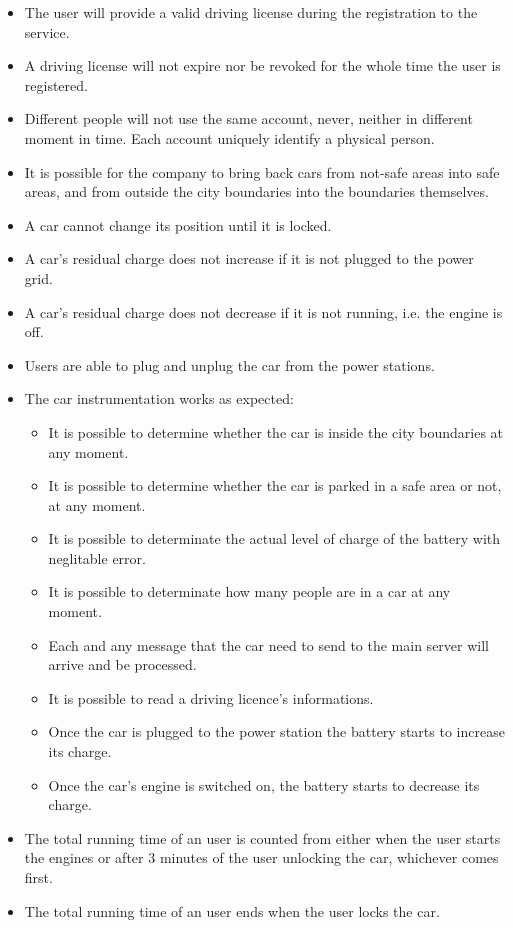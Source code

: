 \documentclass[11pt]{article} %
\begin{document}
\begin{itemize}
	\item The user will provide a valid driving license during the registration to the service.
	\item A driving license will not expire nor be revoked for the whole time the user is registered.
	\item Different people will not use the same account, never, neither in different moment in time. Each account uniquely identify a physical person.
	\item It is possible for the company to bring back cars from not-safe areas into safe areas, and from outside the city boundaries into the boundaries themselves.
	\item A car cannot change its position until it is locked.
	\item A car's residual charge does not increase if it is not plugged to the power grid.
	\item A car's residual charge does not decrease if it is not running, i.e. the engine is off.
	\item Users are able to plug and unplug the car from the power stations.
	\item The car instrumentation works as expected:
	\begin{itemize}
		\item It is possible to determine whether the car is inside the city boundaries at any moment.
		\item It is possible to determine whether the car is parked in a safe area or not, at any moment.
		\item It is possible to determinate the actual level of charge of the battery with neglitable error.
		\item It is possible to determinate how many people are in a car at any moment.
		\item Each and any message that the car need to send to the main server will arrive and be processed.
		\item It is possible to read a driving licence's informations.
		\item Once the car is plugged to the power station the battery starts to increase its charge.
		\item Once the car's engine is switched on, the battery starts to decrease its charge.
	\end{itemize}
	\item The total running time of an user is counted from either when the user starts the engines or after 3 minutes of the user unlocking the car, whichever comes first.
	\item The total running time of an user ends when the user locks the car.

\end{itemize}
\end{document}
